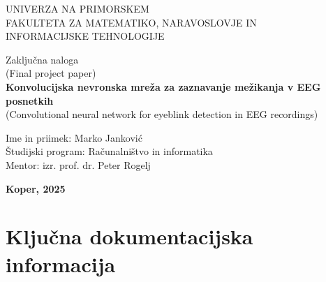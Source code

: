 \documentclass[12pt,a4paper,titlepage,openany]{report}
\begin{document}
\pagestyle{empty}
\begin{center}
\noindent \large UNIVERZA NA PRIMORSKEM\\
\large FAKULTETA ZA MATEMATIKO, NARAVOSLOVJE IN\\
INFORMACIJSKE TEHNOLOGIJE


\normalsize
\vspace{5.5cm}
Zaklju\v cna naloga\\
(Final project paper)\\
\textbf{\large Konvolucijska nevronska mreža za zaznavanje mežikanja v EEG posnetkih}\\
\normalsize
(Convolutional neural network for eyeblink detection in EEG recordings)\\
\end{center}

\begin{flushleft}
\vspace{5cm}
\noindent Ime in priimek: Marko Janković
\\
\noindent \v Studijski program: Računalništvo in informatika
\\
\noindent Mentor: izr. prof. dr. Peter Rogelj
\\
\end{flushleft}

\vspace{4cm}
\begin{center}
\large \textbf{Koper, 2025}
\end{center}
\newpage

\pagestyle{fancy}

\section*{Klju\v cna dokumentacijska informacija}
\end{document}
